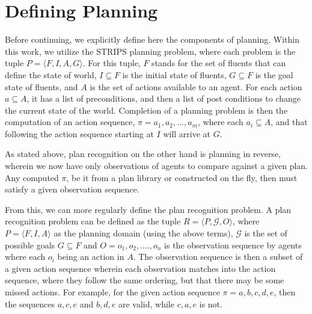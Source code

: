 \section{Defining Planning}

Before continuing, we explicitly define here the components of planning. Within
this work, we utilize the STRIPS planning problem, where each problem is the
tuple $P = \langle F, I, A, G \rangle$. For this tuple, $F$ stands for the set of
fluents that can define the state of world, $I \subseteq F$ is the initial state of
fluents, $G \subseteq F$ is the goal state of fluents, and $A$ is the set of actions
available to an agent. For each action $a \subseteq A$, it has a list
of preconditions, and then a list of post conditions to change the current
state of the world. Completion of a planning problem is then the computation of
an action sequence, $\pi = a_{1}, a_{2}, ..., a_{m}$, where each
$a_{i} \subseteq A$, and that following the action sequence starting at $I$
will arrive at $G$.

As stated above, plan recognition on the other hand is planning in reverse,
wherein we now have only observations of agents to compare against a given plan.
Any computed $\pi$, be it from a plan library or constructed on the fly, then
must satisfy a given observation sequence.

From this, we can more regularly define the plan recognition problem. A plan recognition
problem can be defined as the tuple $R = \langle P, \mathcal{G}, O \rangle$, where
$P = \langle F, I, A \rangle$ as the planning domain (using the above terms),
$\mathcal{G}$ is the set of possible goals $G \subseteq F$ and
$O = o_{1}, o_{2}, ...., o_{n}$ is the observation sequence by agents where each
$o_{i}$ being an action in $A$. The observation sequence is then a subset
of a given action sequence wherein each observation matches into the action
sequence, where they follow the same ordering, but that there may be some missed
actions. For example, for the given action sequence $\pi = {a,b,c,d,e}$, then
the sequences ${a,c,e}$ and ${b,d,e}$ are valid, while ${c,a,e}$ is not.
